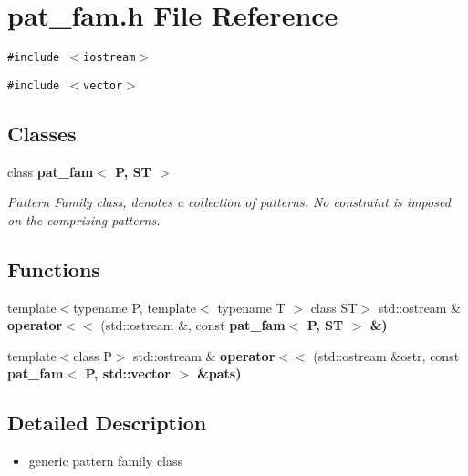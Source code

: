 \section{pat\_\-fam.h File Reference}
\label{pat__fam_8h}
{\tt \#include $<$iostream$>$}\par
{\tt \#include $<$vector$>$}\par
\subsection*{Classes}
\begin{CompactItemize}
\item 
class \bf{pat\_\-fam$<$ P, ST $>$}
\begin{CompactList}\small\item\em Pattern Family class, denotes a collection of patterns. No constraint is imposed on the comprising patterns. \item\end{CompactList}\end{CompactItemize}
\subsection*{Functions}
\begin{CompactItemize}
\item 
template$<$typename P, template$<$ typename T $>$ class ST$>$ std::ostream \& \textbf{operator$<$$<$} (std::ostream \&, const \bf{pat\_\-fam}$<$ P, ST $>$ \&)\label{pat__fam_8h_f6f4b78da6b3a1dace1eb683f32bde9c}

\item 
template$<$class P$>$ std::ostream \& \textbf{operator$<$$<$} (std::ostream \&ostr, const \bf{pat\_\-fam}$<$ P, std::vector $>$ \&pats)\label{pat__fam_8h_0940797241b151c0f9593b2a002e0ef3}

\end{CompactItemize}


\subsection{Detailed Description}
\begin{itemize}
\item generic pattern family class \end{itemize}
